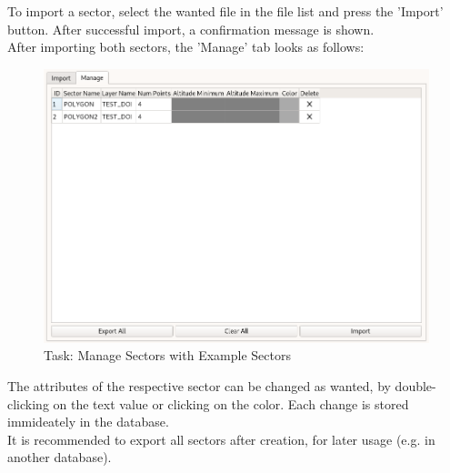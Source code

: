 To import a sector, select the wanted file in the file list and press the 'Import' button. After successful import, a confirmation message is shown. \\

After importing both sectors, the 'Manage' tab looks as follows:

\begin{figure}[H]
    \includegraphics[width=16cm,frame]{../screenshots/manage_sectors_manage2.png}
  \caption{Task: Manage Sectors with Example Sectors}
\end{figure}

The attributes of the respective sector can be changed as wanted, by double-clicking on the text value or clicking on the color. Each change is stored immideately in the database. \\

It is recommended to export all sectors after creation, for later usage (e.g. in another database).

